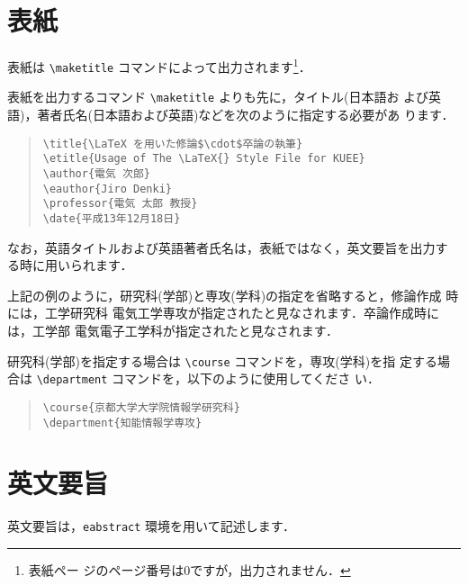 \documentclass[
  sotsuron]{kuee}
\begin{document}
\hypertarget{ux8868ux7d19}{%
\section{表紙}\label{ux8868ux7d19}}

表紙は \verb+\maketitle+ コマンドによって出力されます\footnote{表紙ペー
  ジのページ番号は0ですが，出力されません．}．

表紙を出力するコマンド \verb+\maketitle+ よりも先に，タイトル(日本語お
よび英語)，著者氏名(日本語および英語)などを次のように指定する必要があ
ります．

\begin{quote}
  \begin{verbatim}
\title{\LaTeX を用いた修論$\cdot$卒論の執筆}
\etitle{Usage of The \LaTeX{} Style File for KUEE}
\author{電気 次郎}
\eauthor{Jiro Denki}
\professor{電気 太郎 教授}
\date{平成13年12月18日}
\end{verbatim}
\end{quote}

なお，英語タイトルおよび英語著者氏名は，表紙ではなく，英文要旨を出力す
る時に用いられます．

上記の例のように，研究科(学部)と専攻(学科)の指定を省略すると，修論作成
時には，工学研究科 電気工学専攻が指定されたと見なされます．卒論作成時に
は，工学部 電気電子工学科が指定されたと見なされます．

研究科(学部)を指定する場合は \verb+\course+ コマンドを，専攻(学科)を指
定する場合は \verb+\department+ コマンドを，以下のように使用してくださ
い．

\begin{quote}
  \begin{verbatim}
\course{京都大学大学院情報学研究科}
\department{知能情報学専攻}
\end{verbatim}
\end{quote}

\hypertarget{ux82f1ux6587ux8981ux65e8}{%
\section{英文要旨}\label{ux82f1ux6587ux8981ux65e8}}

英文要旨は，\verb+eabstract+ 環境を用いて記述します．
\end{document}
